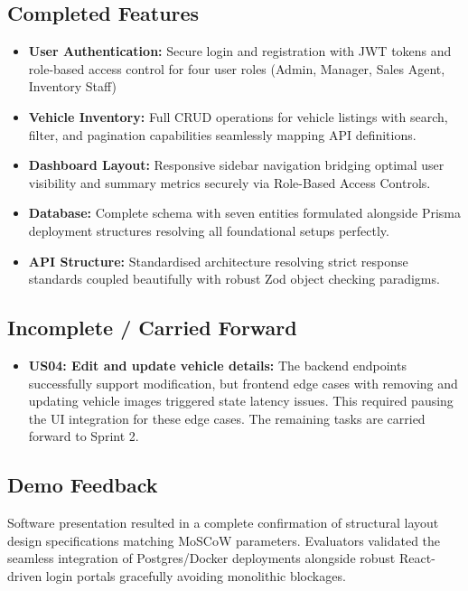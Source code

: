 \documentclass[12pt,a4paper]{article}
\begin{document}
\subsection{Completed Features}

\begin{itemize}[leftmargin=1.5em, itemsep=4pt]
  \item \textbf{User Authentication:} Secure login and registration with JWT tokens and role-based access control for four user roles (Admin, Manager, Sales Agent, Inventory Staff)
  \item \textbf{Vehicle Inventory:} Full CRUD operations for vehicle listings with search, filter, and pagination capabilities seamlessly mapping API definitions.
  \item \textbf{Dashboard Layout:} Responsive sidebar navigation bridging optimal user visibility and summary metrics securely via Role-Based Access Controls.
  \item \textbf{Database:} Complete schema with seven entities formulated alongside Prisma deployment structures resolving all foundational setups perfectly.
  \item \textbf{API Structure:} Standardised architecture resolving strict response standards coupled beautifully with robust Zod object checking paradigms.
\end{itemize}

\subsection{Incomplete / Carried Forward}

\begin{itemize}[leftmargin=1.5em, itemsep=4pt]
  \item \textbf{US04: Edit and update vehicle details:} The backend endpoints successfully support modification, but frontend edge cases with removing and updating vehicle images triggered state latency issues. This required pausing the UI integration for these edge cases. The remaining tasks are carried forward to Sprint 2.
\end{itemize}

\subsection{Demo Feedback}

Software presentation resulted in a complete confirmation of structural layout design specifications matching MoSCoW parameters. Evaluators validated the seamless integration of Postgres/Docker deployments alongside robust React-driven login portals gracefully avoiding monolithic blockages.
\end{document}
